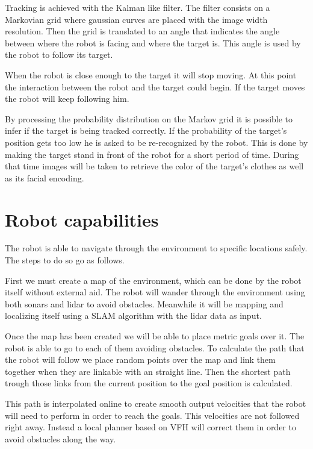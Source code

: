 Tracking is achieved with the Kalman like filter.
The filter consists on a Markovian grid where gaussian curves are placed with the image width resolution.
Then the grid is translated to an angle that indicates the angle between where the robot is facing and where the target is.
This angle is used by the robot to follow its target.

When the robot is close enough to the target it will stop moving.
At this point the interaction between the robot and the target could begin.
If the target moves the robot will keep following him.

By processing the probability distribution on the Markov grid it is possible to infer if the target is being tracked correctly.
If the probability of the target's position gets too low he is asked to be re-recognized by the robot.
This is done by making the target stand in front of the robot for a short period of time.
During that time images will be taken to retrieve the color of the target's clothes as well as its facial encoding. 

\section{Robot capabilities}
The robot is able to navigate through the environment to specific locations safely.
The steps to do so go as follows.

First we must create a map of the environment, which can be done by the robot itself without external aid.
The robot will wander through the environment using both sonars and lidar to avoid obstacles.
Meanwhile it will be mapping and localizing itself using a SLAM algorithm with the lidar data as input.

Once the map has been created we will be able to place metric goals over it.
The robot is able to go to each of them avoiding obstacles.
To calculate the path that the robot will follow we place random points over the map and link them together when they are linkable with an straight line.
Then the shortest path trough those links from the current position to the goal position is calculated.

This path is interpolated online to create smooth output velocities that the robot will need to perform in order to reach the goals.
This velocities are not followed right away.
Instead a local planner based on VFH will correct them in order to avoid obstacles along the way.

